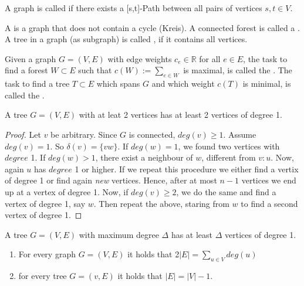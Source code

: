 \setcounter{lecture}{1}
\setcounter{section}{2}

\begin{lec}[2011-10-13]\end{lec}

\begin{defn}[connected]
A graph is called  if there exists a [s,t]-Path between all pairs of vertices $s,t \in V$.
\end{defn}

\begin{defn}
A  is a graph that does not contain a cycle (Kreis). A connected forest is called a
. A tree in a graph (as subgraph) is called
, if it contains all vertices.

Given a graph $G=(V,E)$ with edge weights $c_e \in \mathbb{R}$ for all $e \in E$, the task to find a forest $W \subset E$ such that $c(W):=\sum\limits_{e\in W} $ is maximal, is called the
. 
The task to find a tree $T\subset E$ which spans $G$ and which weight $c(T)$ is minimal, is called the
.
\end{defn}

\begin{lem}
A tree $G=(V,E)$ with at leat 2 vertices has at least 2 vertices of degree 1.
\end{lem}
\begin{proof}
Let $v$ be arbitrary. Since $G$ is connected, $deg(v) \geq 1$. Assume $deg(v)=1$. So $\delta(v)=\{vw\}$. If $deg(w)=1$, we found two vertices with $degree$ 1. If $deg(w)>1$, there exist a neighbour of $w$, different from $v:u$. Now, again $u$ has $degree$ 1 or higher. If we repeat this procedure we either find a vertix of degree 1 or find again \emph{new} vertices. Hence, after at most $n-1$ vertices we end up at a vertex of degree 1. 
Now, if $deg(v) \geq 2$, we do the same and find a vertex of degree 1, say $w$. Then repeat the above, staring from $w$ to find a second vertex of degree 1.
\end{proof}

\begin{cor}
A tree $G=(V,E)$ with maximum degree $\Delta$ has at least $\Delta$ vertices of degree 1.
\end{cor}

\begin{lem}
	\begin{enumerate}
	\item For every graph $G=(V,E)$ it holds that 2$|E|=\sum\limits_{u \in V} deg(u)$
	\item for every tree $G=(v,E)$ it holds that $|E|=|V|-1$.
	\end{enumerate}
	\end{lem}

